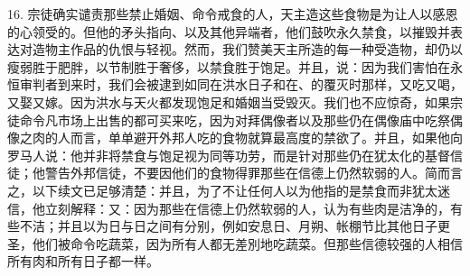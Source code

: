 16. 宗徒确实谴责那些禁止婚姻、命令戒食的人，天主造这些食物是为让人以感恩的心领受的。但他的矛头指向、以及其他异端者，他们鼓吹永久禁食，以摧毁并表达对造物主作品的仇恨与轻视。然而，我们赞美天主所造的每一种受造物，却仍以瘦弱胜于肥胖，以节制胜于奢侈，以禁食胜于饱足。并且，说：因为我们害怕在永恒审判者到来时，我们会被逮到如同在洪水日子和在、的覆灭时那样，又吃又喝，又娶又嫁。因为洪水与天火都发现饱足和婚姻当受毁灭。我们也不应惊奇，如果宗徒命令凡市场上出售的都可买来吃，因为对拜偶像者以及那些仍在偶像庙中吃祭偶像之肉的人而言，单单避开外邦人吃的食物就算最高度的禁欲了。并且，如果他向罗马人说：他并非将禁食与饱足视为同等功劳，而是针对那些仍在犹太化的基督信徒；他警告外邦信徒，不要因他们的食物得罪那些在信德上仍然软弱的人。简而言之，以下续文已足够清楚：并且，为了不让任何人以为他指的是禁食而非犹太迷信，他立刻解释：又：因为那些在信德上仍然软弱的人，认为有些肉是洁净的，有些不洁；并且以为日与日之间有分别，例如安息日、月朔、帐棚节比其他日子更圣，他们被命令吃蔬菜，因为所有人都无差別地吃蔬菜。但那些信德较强的人相信所有肉和所有日子都一样。\par

